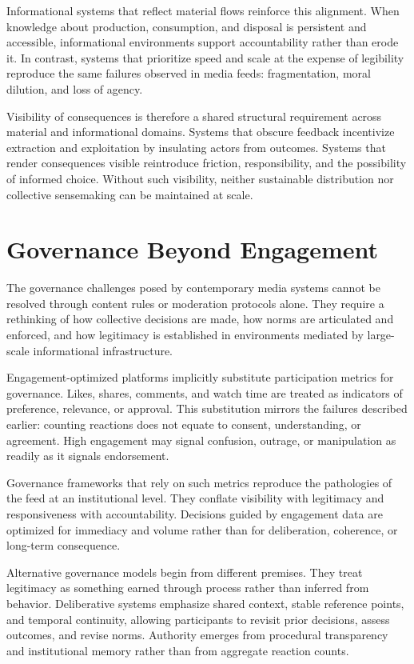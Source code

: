 \documentclass[12pt]{article}
\begin{document}
Informational systems that reflect material flows reinforce this alignment. When knowledge about production, consumption, and disposal is persistent and accessible, informational environments support accountability rather than erode it. In contrast, systems that prioritize speed and scale at the expense of legibility reproduce the same failures observed in media feeds: fragmentation, moral dilution, and loss of agency.

Visibility of consequences is therefore a shared structural requirement across material and informational domains. Systems that obscure feedback incentivize extraction and exploitation by insulating actors from outcomes. Systems that render consequences visible reintroduce friction, responsibility, and the possibility of informed choice. Without such visibility, neither sustainable distribution nor collective sensemaking can be maintained at scale.

\section{Governance Beyond Engagement}

The governance challenges posed by contemporary media systems cannot be resolved through content rules or moderation protocols alone. They require a rethinking of how collective decisions are made, how norms are articulated and enforced, and how legitimacy is established in environments mediated by large-scale informational infrastructure.

Engagement-optimized platforms implicitly substitute participation metrics for governance. Likes, shares, comments, and watch time are treated as indicators of preference, relevance, or approval. This substitution mirrors the failures described earlier: counting reactions does not equate to consent, understanding, or agreement. High engagement may signal confusion, outrage, or manipulation as readily as it signals endorsement.

Governance frameworks that rely on such metrics reproduce the pathologies of the feed at an institutional level. They conflate visibility with legitimacy and responsiveness with accountability. Decisions guided by engagement data are optimized for immediacy and volume rather than for deliberation, coherence, or long-term consequence.

Alternative governance models begin from different premises. They treat legitimacy as something earned through process rather than inferred from behavior. Deliberative systems emphasize shared context, stable reference points, and temporal continuity, allowing participants to revisit prior decisions, assess outcomes, and revise norms. Authority emerges from procedural transparency and institutional memory rather than from aggregate reaction counts.
\end{document}
